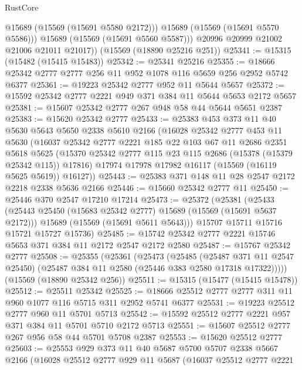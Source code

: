 \begin{lexlean}{RustCore}
\begin{coremodule}
              @15689
              (@15569 (@15691 @5580 @2172)))
            @15689
            (@15569 (@15691 @5570 @5586)))
          @15689
          (@15569 (@15691 @5560 @5587)))
        @20996
        @20999
        @21002
        @21006
        @21011
        @21017))
    (@15569 (@18890 @25216 @251))
@25341 := @15315 (@15482 (@15415 @15483))
@25342 := @25341 @25216
@25355 := @18666 @25342 @2777 @2777 @256 @11 @952 @1078 @116 @5659 @256 @2952 @5742 @6377
@25361 := @19223 @25342 @2777 @952 @11 @5644 @5657
@25372 := @15592 @25342 @2777 @2221 @949 @371 @384 @11 @5644 @5653 @2172 @5657
@25381 := @15607 @25342 @2777 @267 @948 @58 @44 @5644 @5651 @2387
@25383 := @15620 @25342 @2777
@25433 := @25383
    @453
    @373
    @11
    @40
    @5630
    @5643
    @5650
    @2338
    @5610
    @2166
    (@16028
      @25342
      @2777
      @453
      @11
      @5630
      (@16037
        @25342
        @2777
        @2221
        @185
        @22
        @103
        @67
        @11
        @2686
        @2351
        @5618
        @5625
        (@15370 @25342 @2777 @115 @23 @115 @2686 (@15378 (@15379 @25342 @115)) @17816)
        @17974
        @17978
        @17982
        @16117
        (@15569 (@16119 @5625 @5619))
        @16127))
@25443 := @25383 @371 @148 @11 @28 @2547 @2172 @2218 @2338 @5636 @2166
@25446 := @15660 @25342 @2777 @11
@25450 := @25446 @370 @2547 @17210 @17214
@25473 := @25372
    (@25381
      (@25433
        (@25443 @25450 (@15683 @25342 @2777) @15689 (@15569 (@15691 @5637 @2172)))
        @15689
        (@15569 (@15691 @5611 @5643)))
      @15707
      @15711
      @15716
      @15721
      @15727
      @15736)
@25485 := @15742 @25342 @2777 @2221 @15746 @5653 @371 @384 @11 @2172 @2547 @2172 @2580
@25487 := @15767 @25342 @2777
@25508 := @25355
    (@25361
      (@25473
        (@25485
          (@25487 @371 @11 @2547 @25450)
          (@25487 @384 @11 @2580 (@25446 @383 @2580 @17318 @17322)))))
    (@15569 (@18890 @25342 @256))
@25511 := @15315 (@15477 (@15415 @15478))
@25512 := @25511 @25342
@25525 := @18666 @25512 @2777 @2777 @311 @11 @960 @1077 @116 @5715 @311 @2952 @5741 @6377
@25531 := @19223 @25512 @2777 @960 @11 @5701 @5713
@25542 := @15592 @25512 @2777 @2221 @957 @371 @384 @11 @5701 @5710 @2172 @5713
@25551 := @15607 @25512 @2777 @267 @956 @58 @44 @5701 @5708 @2387
@25553 := @15620 @25512 @2777
@25603 := @25553
    @929
    @373
    @11
    @40
    @5687
    @5700
    @5707
    @2338
    @5667
    @2166
    (@16028
      @25512
      @2777
      @929
      @11
      @5687
      (@16037
        @25512
        @2777
        @2221

\end{coremodule}
\end{lexlean}
